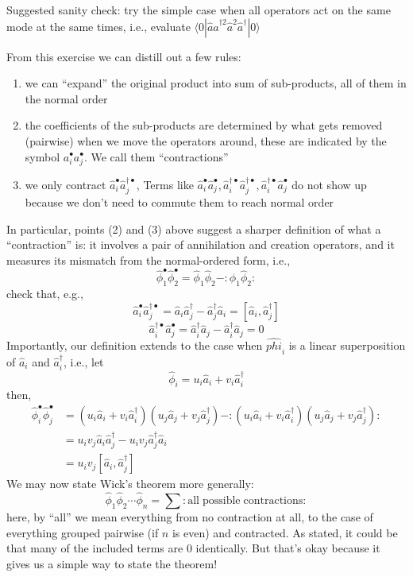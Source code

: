 Suggested sanity check: try the simple case when all operators act on the same mode at the same times, i.e., evaluate $\langle 0|\hat{a}\hat{a}^{\dagger 2}\hat{a}^2\hat{a}^{\dagger}|0\rangle$

From this exercise we can distill out a few rules:
\begin{enumerate}
    \item we can ``expand'' the original product into sum of sub-products, all of them in the normal order
    \item the coefficients of the sub-products are determined by what gets removed (pairwise) when we move the operators around, these are indicated by the symbol $a_i^\bullet a_j^\bullet$. We call them ``contractions''
    \item we only contract $\hat{a}_{i}^{\bullet}\hat{a}_{j}^{\dagger \bullet}$, Terms like $\hat{a}_{i}^{\bullet}\hat{a}_{j}^{\bullet},\hat{a}_{i}^{\dagger \bullet}\hat{a}_{j}^{\dagger \bullet},\hat{a}_{i}^{\dagger \bullet}\hat{a}_{j}^{\bullet}$ do not show up because we don't need to commute them to reach normal order
\end{enumerate}

In particular, points (2) and (3) above suggest a sharper definition of what a ``contraction'' is: it involves a pair of annihilation and creation operators, and it measures its mismatch from the normal-ordered form, i.e.,
\[ \hat{\phi}_{1}^{\bullet}\hat{\phi}_{2}^{\bullet}=\hat{\phi}_1\hat{\phi}_2-:\hat{\phi}_1\hat{\phi}_2:\]
check that, e.g.,
\[ \hat{a}_{i}^{\bullet}\hat{a}_{j}^{\dagger \bullet}=\hat{a}_i\hat{a}_{j}^{\dagger}-\hat{a}_{j}^{\dagger}\hat{a}_i=\left[ \hat{a}_i,\hat{a}_{j}^{\dagger} \right] \]
\[ \hat{a}_{i}^{\dagger \bullet}\hat{a}_{j}^{\bullet}=\hat{a}_{i}^{\dagger}\hat{a}_j-\hat{a}_{i}^{\dagger}\hat{a}_j=0\]
Importantly, our definition extends to the case when $\hat{phi}_i$ is a linear superposition of $\hat{a}_i$ and $\hat{a}_i^\dagger$, i.e., let
\[ \hat{\phi}_i=u_i\hat{a}_i+v_i\hat{a}_{i}^{\dagger}\]
then,
\begin{align*}
    \hat{\phi}_{i}^{\bullet}\hat{\phi}_{j}^{\bullet}&=\left( u_i\hat{a}_i+v_i\hat{a}_{i}^{\dagger} \right) \left( u_j\hat{a}_j+v_j\hat{a}_{j}^{\dagger} \right) -:\left( u_i\hat{a}_i+v_i\hat{a}_{i}^{\dagger} \right) \left( u_j\hat{a}_j+v_j\hat{a}_{j}^{\dagger} \right) :\\
    &=u_iv_j\hat{a}_i\hat{a}_{j}^{\dagger}-u_iv_j\hat{a}_{j}^{\dagger}\hat{a}_i\\
    &=u_iv_j\left[ \hat{a}_i,\hat{a}_{j}^{\dagger} \right]
\end{align*}
We may now state Wick's theorem more generally:
\[ \hat{\phi}_1\hat{\phi}_2\cdots \hat{\phi}_n=\sum{:\mathrm{all}\;\mathrm{possible}\;\mathrm{contractions}:}\]
here, by ``all'' we mean everything from no contraction at all, to the case of everything grouped pairwise (if $n$ is even) and contracted. As stated, it could be that many of the included terms are $0$ identically. But that's okay because it gives us a simple way to state the theorem!

